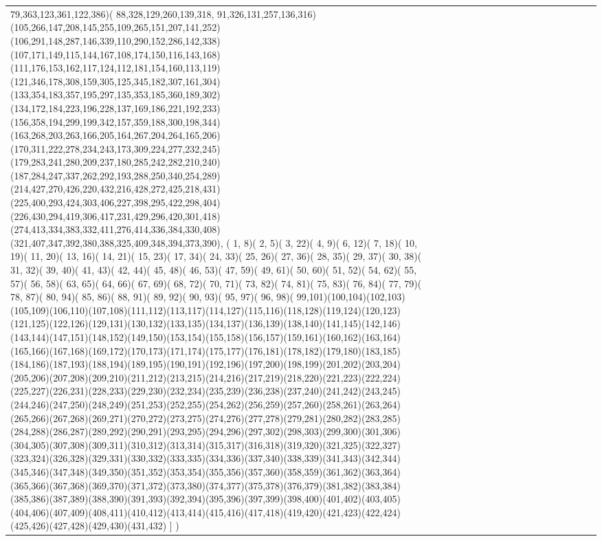 \documentclass[varwidth=\maxdimen,border=10]{standalone}
\begin{document}
\begin{tabular}{@{}l@{}l@{}l@{}l@{}l@{}l@{}l@{}l@{}l@{}l@{}l@{}l@{}l@{}l@{}l@{}l@{}l@{}l@{}}
79,363,123,361,122,386)( 88,328,129,260,139,318, 91,326,131,257,136,316)(105,266,147,208,145,255,109,265,151,207,141,252)(106,291,148,287,146,339,110,290,152,286,142,338)(107,171,149,115,144,167,108,174,150,116,143,168)(111,176,153,162,117,124,112,181,154,160,113,119)(121,346,178,308,159,305,125,345,182,307,161,304)(133,354,183,357,195,297,135,353,185,360,189,302)(134,172,184,223,196,228,137,169,186,221,192,233)(156,358,194,299,199,342,157,359,188,300,198,344)(163,268,203,263,166,205,164,267,204,264,165,206)(170,311,222,278,234,243,173,309,224,277,232,245)(179,283,241,280,209,237,180,285,242,282,210,240)(187,284,247,337,262,292,193,288,250,340,254,289)(214,427,270,426,220,432,216,428,272,425,218,431)(225,400,293,424,303,406,227,398,295,422,298,404)(226,430,294,419,306,417,231,429,296,420,301,418)(274,413,334,383,332,411,276,414,336,384,330,408)(321,407,347,392,380,388,325,409,348,394,373,390), (  1,  8)(  2,  5)(  3, 22)(  4,  9)(  6, 12)(  7, 18)( 10, 19)( 11, 20)( 13, 16)( 14, 21)( 15, 23)( 17, 34)( 24, 33)( 25, 26)( 27, 36)( 28, 35)( 29, 37)( 30, 38)( 31, 32)( 39, 40)( 41, 43)( 42, 44)( 45, 48)( 46, 53)( 47, 59)( 49, 61)( 50, 60)( 51, 52)( 54, 62)( 55, 57)( 56, 58)( 63, 65)( 64, 66)( 67, 69)( 68, 72)( 70, 71)( 73, 82)( 74, 81)( 75, 83)( 76, 84)( 77, 79)( 78, 87)( 80, 94)( 85, 86)( 88, 91)( 89, 92)( 90, 93)( 95, 97)( 96, 98)( 99,101)(100,104)(102,103)(105,109)(106,110)(107,108)(111,112)(113,117)(114,127)(115,116)(118,128)(119,124)(120,123)(121,125)(122,126)(129,131)(130,132)(133,135)(134,137)(136,139)(138,140)(141,145)(142,146)(143,144)(147,151)(148,152)(149,150)(153,154)(155,158)(156,157)(159,161)(160,162)(163,164)(165,166)(167,168)(169,172)(170,173)(171,174)(175,177)(176,181)(178,182)(179,180)(183,185)(184,186)(187,193)(188,194)(189,195)(190,191)(192,196)(197,200)(198,199)(201,202)(203,204)(205,206)(207,208)(209,210)(211,212)(213,215)(214,216)(217,219)(218,220)(221,223)(222,224)(225,227)(226,231)(228,233)(229,230)(232,234)(235,239)(236,238)(237,240)(241,242)(243,245)(244,246)(247,250)(248,249)(251,253)(252,255)(254,262)(256,259)(257,260)(258,261)(263,264)(265,266)(267,268)(269,271)(270,272)(273,275)(274,276)(277,278)(279,281)(280,282)(283,285)(284,288)(286,287)(289,292)(290,291)(293,295)(294,296)(297,302)(298,303)(299,300)(301,306)(304,305)(307,308)(309,311)(310,312)(313,314)(315,317)(316,318)(319,320)(321,325)(322,327)(323,324)(326,328)(329,331)(330,332)(333,335)(334,336)(337,340)(338,339)(341,343)(342,344)(345,346)(347,348)(349,350)(351,352)(353,354)(355,356)(357,360)(358,359)(361,362)(363,364)(365,366)(367,368)(369,370)(371,372)(373,380)(374,377)(375,378)(376,379)(381,382)(383,384)(385,386)(387,389)(388,390)(391,393)(392,394)(395,396)(397,399)(398,400)(401,402)(403,405)(404,406)(407,409)(408,411)(410,412)(413,414)(415,416)(417,418)(419,420)(421,423)(422,424)(425,426)(427,428)(429,430)(431,432) ] )

\end{tabular}
\end{document}

